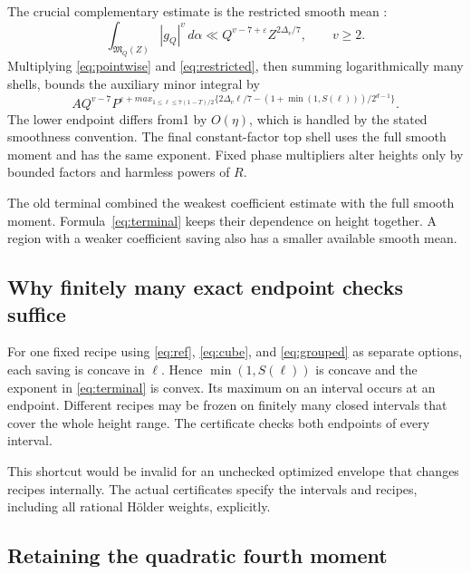 \documentclass[11pt,letterpaper]{article}
\theoremstyle{remark}
\newcommand{\M}{\mathfrak M}
\newcommand{\eps}{\varepsilon}
\newcommand{\dd}{\,d\alpha}
\begin{document}
The crucial complementary estimate is the restricted smooth mean
\cite[Theorem~4.2]{BW23}:
\begin{equation}\label{eq:restricted}
 \int_{\M_Q(Z)}|g_Q|^v\dd
             \ll Q^{v-7+\eps}Z^{2\Delta_v/7},\qquad v\ge2.
\end{equation}
Multiplying \eqref{eq:pointwise} and \eqref{eq:restricted}, then summing logarithmically
many shells, bounds the auxiliary minor integral by
\begin{equation}\label{eq:terminal}
 A Q^{v-7}P^{\eps+max_{1\le\ell\le7(1-T)/2}
 \{2\Delta_v\ell/7-(1+\min(1,S(\ell)))/2^{d-1}\}}.
\end{equation}
The lower endpoint differs from1 by $O(\eta)$, which is handled by the stated
smoothness convention. The final constant-factor top shell uses the full smooth
moment and has the same exponent. Fixed phase multipliers alter heights only by
bounded factors and harmless powers of $R$.

The old terminal combined the weakest coefficient estimate with the full smooth
moment. Formula~\eqref{eq:terminal} keeps their dependence on height together.
A region with a weaker coefficient saving also has a smaller available smooth mean.

\subsection{Why finitely many exact endpoint checks suffice}

For one fixed recipe using \eqref{eq:ref}, \eqref{eq:cube}, and
\eqref{eq:grouped} as separate options,
each saving is concave in $\ell$. Hence $\min(1,S(\ell))$ is concave and the exponent
in \eqref{eq:terminal} is convex. Its maximum on an interval occurs at an endpoint.
Different recipes may be frozen on finitely many closed intervals that cover the
whole height range. The certificate checks both endpoints of every interval.

This shortcut would be invalid for an unchecked optimized envelope that changes
recipes internally. The actual certificates specify the intervals and recipes,
including all rational H\"older weights, explicitly.

\subsection{Retaining the quadratic fourth moment}\label{sec:quadratic-fourth}
\end{document}

